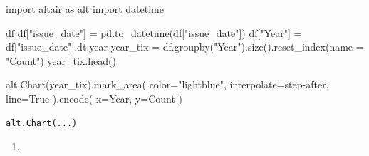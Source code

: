 \documentclass[
  letterpaper,
  DIV=11,
  numbers=noendperiod]{scrartcl}
\newenvironment{Shaded}{\begin{snugshade}}{\end{snugshade}}
\newcommand{\ImportTok}[1]{\textcolor[rgb]{0.00,0.46,0.62}{#1}}
\newcommand{\NormalTok}[1]{\textcolor[rgb]{0.00,0.23,0.31}{#1}}
\newcommand{\OperatorTok}[1]{\textcolor[rgb]{0.37,0.37,0.37}{#1}}
\newcommand{\StringTok}[1]{\textcolor[rgb]{0.13,0.47,0.30}{#1}}
\newcommand{\VariableTok}[1]{\textcolor[rgb]{0.07,0.07,0.07}{#1}}
\providecommand{\tightlist}{%
  \setlength{\itemsep}{0pt}\setlength{\parskip}{0pt}}\usepackage{longtable,booktabs,array}
\begin{document}
\begin{Shaded}
\begin{Highlighting}[]
\ImportTok{import}\NormalTok{ altair }\ImportTok{as}\NormalTok{ alt}
\ImportTok{import}\NormalTok{ datetime}

\NormalTok{df}
\NormalTok{df[}\StringTok{"issue\_date"}\NormalTok{] }\OperatorTok{=}\NormalTok{ pd.to\_datetime(df[}\StringTok{"issue\_date"}\NormalTok{])}
\NormalTok{df[}\StringTok{"Year"}\NormalTok{] }\OperatorTok{=}\NormalTok{ df[}\StringTok{"issue\_date"}\NormalTok{].dt.year}
\NormalTok{year\_tix }\OperatorTok{=}\NormalTok{ df.groupby(}\StringTok{"Year"}\NormalTok{).size().reset\_index(name }\OperatorTok{=} \StringTok{"Count"}\NormalTok{)}
\NormalTok{year\_tix.head()}

\NormalTok{alt.Chart(year\_tix).mark\_area(}
\NormalTok{    color}\OperatorTok{=}\StringTok{"lightblue"}\NormalTok{,}
\NormalTok{    interpolate}\OperatorTok{=}\StringTok{\textquotesingle{}step{-}after\textquotesingle{}}\NormalTok{,}
\NormalTok{    line}\OperatorTok{=}\VariableTok{True}
\NormalTok{).encode(}
\NormalTok{    x}\OperatorTok{=}\StringTok{\textquotesingle{}Year\textquotesingle{}}\NormalTok{,}
\NormalTok{    y}\OperatorTok{=}\StringTok{\textquotesingle{}Count\textquotesingle{}}
\NormalTok{)}
\end{Highlighting}
\end{Shaded}

\begin{verbatim}
alt.Chart(...)
\end{verbatim}

\begin{enumerate}
\def\labelenumi{\arabic{enumi}.}
\tightlist
\item
\end{enumerate}
\end{document}
